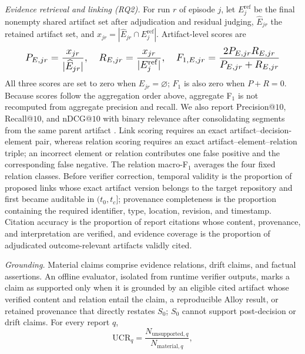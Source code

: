 \documentclass[10pt,conference]{IEEEtran}
\begin{document}
\par\noindent\textit{Evidence retrieval and linking (RQ2).} For run $r$ of episode $j$, let $E_j^{\mathrm{ref}}$ be the final nonempty shared artifact set after adjudication and residual judging, $\widehat{E}_{jr}$ the retained artifact set, and $x_{jr}=|\widehat{E}_{jr}\cap E_j^{\mathrm{ref}}|$. Artifact-level scores are
\begin{equation}
\resizebox{0.90\columnwidth}{!}{$\displaystyle P_{E,jr}=\frac{x_{jr}}{|\widehat{E}_{jr}|},\quad R_{E,jr}=\frac{x_{jr}}{|E_j^{\mathrm{ref}}|},\quad F_{1,E,jr}=\frac{2P_{E,jr}R_{E,jr}}{P_{E,jr}+R_{E,jr}}$}
\label{eq:evidence-metrics}
\end{equation}
All three scores are set to zero when $\widehat{E}_{jr}=\varnothing$; $F_1$ is also zero when $P+R=0$. Because scores follow the aggregation order above, aggregate F$_1$ is not recomputed from aggregate precision and recall. We also report Precision@$10$, Recall@$10$, and nDCG@$10$ with binary relevance after consolidating segments from the same parent artifact \cite{Jarvelin2002NDCG}. Link scoring requires an exact artifact--decision-element pair, whereas relation scoring requires an exact artifact--element--relation triple; an incorrect element or relation contributes one false positive and the corresponding false negative. The relation macro-F$_1$ averages the four fixed relation classes. Before verifier correction, temporal validity is the proportion of proposed links whose exact artifact version belongs to the target repository and first became auditable in $(t_0,t_c]$; provenance completeness is the proportion containing the required identifier, type, location, revision, and timestamp. Citation accuracy is the proportion of report citations whose content, provenance, and interpretation are verified, and evidence coverage is the proportion of adjudicated outcome-relevant artifacts validly cited.
\par\noindent\textit{Grounding.} Material claims comprise evidence relations, drift claims, and factual assertions. An offline evaluator, isolated from runtime verifier outputs, marks a claim as supported only when it is grounded by an eligible cited artifact whose verified content and relation entail the claim, a reproducible Alloy result, or retained provenance that directly restates $S_0$; $S_0$ cannot support post-decision or drift claims. For every report $q$,
\begin{equation}
\mathrm{UCR}_{q}=\frac{N_{\mathrm{unsupported},q}}{N_{\mathrm{material},q}},
\label{eq:ucr}
\end{equation}
\end{document}
